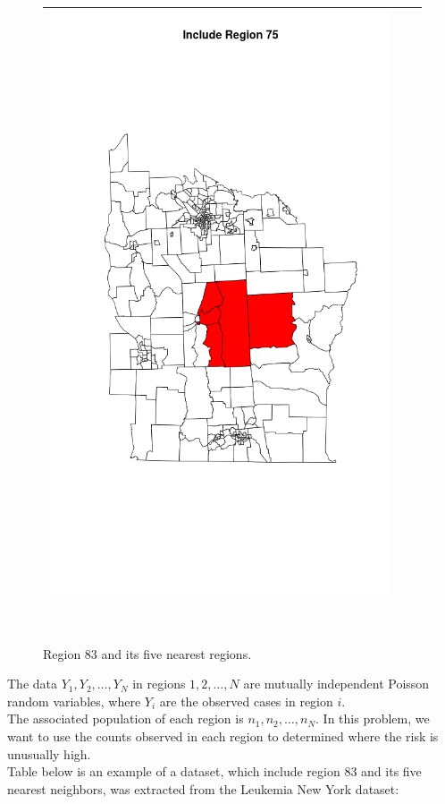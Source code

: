 \documentclass[12pt]{article}
\begin{document}
\begin{figure}[!ht]
\begin{tabular}{|c|c|c|}
									\includegraphics[scale=0.18]{ny75.png} && \\
		\hline	
		
		\end{tabular}	\\
		\caption{Region 83 and its five nearest regions. \label{f:gull}}
		\end{figure}	
			\newpage
			The data $Y_1,Y_2,\dots,Y_N$ in regions $1,2,\dots,N$ are mutually independent Poisson random variables, where $Y_i$ are the observed cases in region $i$. \\ 
			The associated population of each region is $n_1,n_2,\dots,n_N$. In this problem, we want to use the counts observed in each region to determined where the risk is unusually high.\\
Table below is an example of a dataset, which include region 83 and its five nearest neighbors, was extracted from the Leukemia New York dataset: \\
\end{document}
